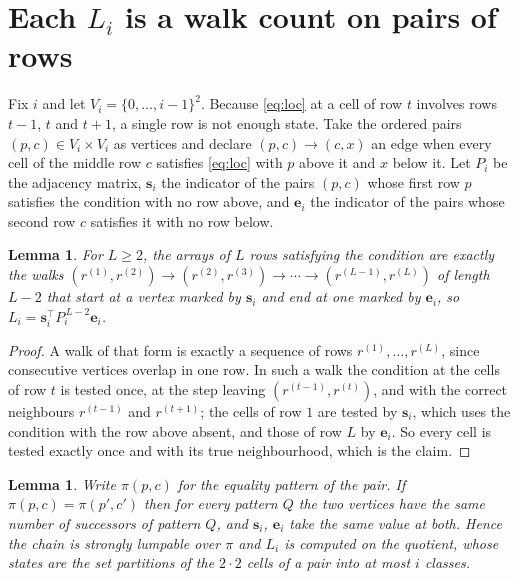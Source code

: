 \documentclass[11pt,a4paper]{article}
\theoremstyle{plain}
\newtheorem{lemma}[theorem]{Lemma}
\theoremstyle{definition}
\begin{document}
\section{Each $L_i$ is a walk count on pairs of rows}

Fix $i$ and let $V_i=\{0,\dots,i-1\}^{2}$. Because \eqref{eq:loc} at a cell of row
$t$ involves rows $t-1$, $t$ and $t+1$, a single row is not enough state. Take the
ordered pairs $(p,c)\in V_i\times V_i$ as vertices and declare $(p,c)\to(c,x)$ an edge when
every cell of the middle row $c$ satisfies \eqref{eq:loc} with $p$ above it and $x$
below it. Let $P_i$ be the adjacency matrix, $\mathbf{s}_i$ the indicator of the pairs
$(p,c)$ whose first row $p$ satisfies the condition with no row above, and
$\mathbf{e}_i$ the indicator of the pairs whose second row $c$ satisfies it with no
row below.

\begin{lemma}\label{lem:walk}
For $L\ge2$, the arrays of $L$ rows satisfying the condition are exactly the walks
$(r^{(1)},r^{(2)})\to(r^{(2)},r^{(3)})\to\cdots\to(r^{(L-1)},r^{(L)})$ of length
$L-2$ that start at a vertex marked by $\mathbf{s}_i$ and end at one marked by
$\mathbf{e}_i$, so
$L_i=\mathbf{s}_i^{\!\top}P_i^{\,L-2}\mathbf{e}_i$.
\end{lemma}

\begin{proof}
A walk of that form is exactly a sequence of rows $r^{(1)},\dots,r^{(L)}$, since
consecutive vertices overlap in one row. In such a walk the condition at the cells of
row $t$ is tested once, at the step leaving $(r^{(t-1)},r^{(t)})$, and with the
correct neighbours $r^{(t-1)}$ and $r^{(t+1)}$; the cells of row $1$ are tested by
$\mathbf{s}_i$, which uses the condition with the row above absent, and those of row
$L$ by $\mathbf{e}_i$. So every cell is tested exactly once and with its true
neighbourhood, which is the claim.
\end{proof}

\begin{lemma}\label{lem:lump}
Write $\pi(p,c)$ for the equality pattern of the pair. If $\pi(p,c)=\pi(p',c')$ then for
every pattern $Q$ the two vertices have the same number of successors of pattern $Q$, and
$\mathbf{s}_i$, $\mathbf{e}_i$ take the same value at both. Hence the chain is strongly
lumpable over $\pi$ and $L_i$ is computed on the quotient, whose states are the set
partitions of the $2\cdot2$ cells of a pair into at most $i$ classes.
\end{lemma}
\end{document}
